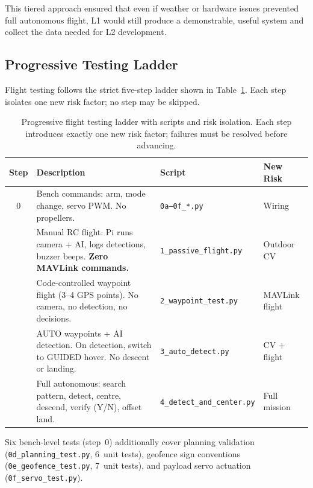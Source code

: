 This tiered approach ensured that even if weather or hardware issues
prevented full autonomous flight, L1 would still produce a
demonstrable, useful system and collect the data needed for L2
development.

\subsection{Progressive Testing Ladder}\label{sec:test-ladder}

Flight testing follows the strict five-step ladder shown in Table~\ref{tab:test-ladder}.  Each step isolates
one new risk factor; no step may be skipped.

\begin{table}[H]
\centering
\compactTable
\caption{Progressive flight testing ladder with scripts and risk isolation.  Each step introduces exactly one new risk factor; failures must be resolved before advancing.}
\label{tab:test-ladder}
\begin{tabularx}{\linewidth}{@{}c X l l@{}}
\toprule
\textbf{Step} & \textbf{Description} & \textbf{Script} & \textbf{New Risk} \\
\midrule
0 & Bench commands: arm, mode change, servo PWM.
    No propellers. &
  \texttt{0a--0f\_*.py} & Wiring \\
\addlinespace
1 & Manual RC flight.  Pi runs camera + AI, logs detections,
    buzzer beeps.  \textbf{Zero MAVLink commands.} &
  \texttt{1\_passive\_flight.py} & Outdoor CV \\
\addlinespace
2 & Code-controlled waypoint flight (3--4 GPS points).
    No camera, no detection, no decisions. &
  \texttt{2\_waypoint\_test.py} & MAVLink flight \\
\addlinespace
3 & AUTO waypoints + AI detection.  On detection, switch
    to GUIDED hover.  No descent or landing. &
  \texttt{3\_auto\_detect.py} & CV + flight \\
\addlinespace
4 & Full autonomous: search pattern, detect, centre,
    descend, verify (Y/N), offset land. &
  \texttt{4\_detect\_and\_center.py} & Full mission \\
\bottomrule
\end{tabularx}
\end{table}

Six bench-level tests (step~0) additionally cover planning validation
(\texttt{0d\_planning\_test.py}, 6~unit tests), geofence sign
conventions (\texttt{0e\_geofence\_test.py}, 7~unit tests), and
payload servo actuation (\texttt{0f\_servo\_test.py}).

